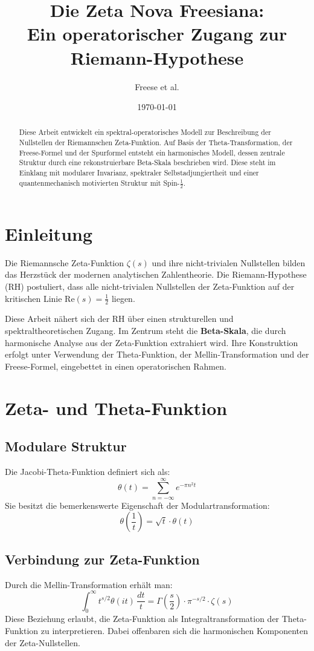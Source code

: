\documentclass[12pt]{article}
\title{\textbf{Die Zeta Nova Freesiana: \\Ein operatorischer Zugang zur Riemann-Hypothese}}
\author{Freese et al.}
\date{\today}
\begin{document}
\maketitle

\begin{abstract}
Diese Arbeit entwickelt ein spektral-operatorisches Modell zur Beschreibung der Nullstellen der Riemannschen Zeta-Funktion. Auf Basis der Theta-Transformation, der Freese-Formel und der Spurformel entsteht ein harmonisches Modell, dessen zentrale Struktur durch eine rekonstruierbare Beta-Skala beschrieben wird. Diese steht im Einklang mit modularer Invarianz, spektraler Selbstadjungiertheit und einer quantenmechanisch motivierten Struktur mit Spin-$\tfrac{1}{2}$.
\end{abstract}

\section{Einleitung}
Die Riemannsche Zeta-Funktion \(\zeta(s)\) und ihre nicht-trivialen Nullstellen bilden das Herzstück der modernen analytischen Zahlentheorie. Die Riemann-Hypothese (RH) postuliert, dass alle nicht-trivialen Nullstellen der Zeta-Funktion auf der kritischen Linie \(\text{Re}(s) = \tfrac{1}{2}\) liegen.

Diese Arbeit nähert sich der RH über einen strukturellen und spektraltheoretischen Zugang. Im Zentrum steht die \textbf{Beta-Skala}, die durch harmonische Analyse aus der Zeta-Funktion extrahiert wird. Ihre Konstruktion erfolgt unter Verwendung der Theta-Funktion, der Mellin-Transformation und der Freese-Formel, eingebettet in einen operatorischen Rahmen.

\section{Zeta- und Theta-Funktion}

\subsection{Modulare Struktur}
Die Jacobi-Theta-Funktion definiert sich als:
\[
\theta(t) = \sum_{n=-\infty}^{\infty} e^{-\pi n^2 t}
\]
Sie besitzt die bemerkenswerte Eigenschaft der Modulartransformation:
\[
\theta\left(\frac{1}{t}\right) = \sqrt{t} \cdot \theta(t)
\]

\subsection{Verbindung zur Zeta-Funktion}
Durch die Mellin-Transformation erhält man:
\[
\int_0^\infty t^{s/2} \theta(it) \, \frac{dt}{t} = \Gamma\left( \frac{s}{2} \right) \cdot \pi^{-s/2} \cdot \zeta(s)
\]
Diese Beziehung erlaubt, die Zeta-Funktion als Integraltransformation der Theta-Funktion zu interpretieren. Dabei offenbaren sich die harmonischen Komponenten der Zeta-Nullstellen.
\end{document}
